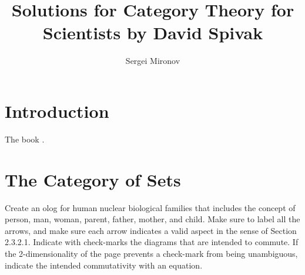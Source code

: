 \documentclass{article}
\title{Solutions for Category Theory for Scientists by David Spivak}
\author{Sergei Mironov}
\begin{document}
\maketitle

\tableofcontents

\section{Introduction}

The book .

\section{The Category of Sets}


Create an olog for human nuclear biological families that includes the concept of person, man,
woman, parent, father, mother, and child. Make sure to label all the arrows, and make sure each
arrow indicates a valid aspect in the sense of Section 2.3.2.1. Indicate with check-marks the
diagrams that are intended to commute. If the 2-dimensionality of the page prevents a check-mark
from being unambiguous, indicate the intended commutativity with an equation.

\ans

\begin{center}
\end{center}
\end{document}
